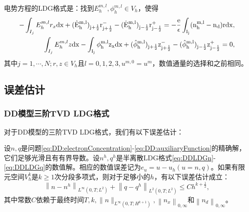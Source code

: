 电势方程的LDG格式是：找到$E_h^{m,l},\phi_h^{m,l} \in V_h$，使得
\begin{align}
    -\int_{I_j} E_h^{m,l}r_x \rm{d}x + (\hat{E}_h^{m,l})_{j+\frac{1}{2}}r_{j+\frac{1}{2}}^- - (\hat{E}_h^{m,l})_{j-\frac{1}{2}}r_{j-\frac{1}{2}}^+ = -\frac{e}{\epsilon}\int_{I_j}(n_h^{m,l} - n_d) r\rm{d} x, \label{eq:IMEX:poisson:LDG:1} \\
    \int_{I_j} E_h^{m,l}z \rm{d}x - \int_{I_j} \phi_h^{m,l}z_x \rm{d}x  + (\hat{\phi}_h^{m,l})_{j+\frac{1}{2}}z^-_{j+\frac{1}{2}} - (\hat{\phi}_h^{m,l})_{j-\frac{1}{2}}z_{j-\frac{1}{2}}^+  = 0,\label{eq:IMEX:poisson:LDG:2}
\end{align}
其中$j = 1,\cdots,N; r,z \in V_h$且$l = 0,1,2,3, u^{m,0} = u^m$，数值通量的选择和之前相同。

\subsection{误差估计}
\subsubsection{DD模型三阶TVD LDG格式}
对于DD模型的三阶TVD LDG格式，我们有以下误差估计\cite{liu2010error}：
\begin{theorem}
    设$n, q$是问题\eqref{eq:DD:electronConcentration}-\eqref{eq:DD:auxiliaryFunction}的精确解，它们足够光滑且有有界导数。设$n^{h}, q^{h}$是半离散LDG格式\eqref{eq:DDLDGn}-\eqref{eq:DDLDGq}的数值解。相应的数值误差记为$e_{u}=u-u_{h}(u=n, q)$。如果有限元空间$V_{h}^{k}$是$k \geq 1$次分段多项式，则对于足够小的$h$，有以下误差估计成立：
    \begin{equation}
        \left\|n-n^{h}\right\|_{L^{\infty}\left(0, T ; L^{2}\right)}+\left\|q-q^{h}\right\|_{L^{2}\left(0, T ; L^{2}\right)} \leq C h^{k+\frac{1}{2}},
    \end{equation}
    其中常数$C$依赖于最终时间$T,k, \|n\|_{L^{\infty}\left(0, T ; H^{k+1}\right)}, \left\|n_{x}\right\|_{0, \infty}和\left\|n_{d}\right\|_{0, \infty}$。
\end{theorem}

